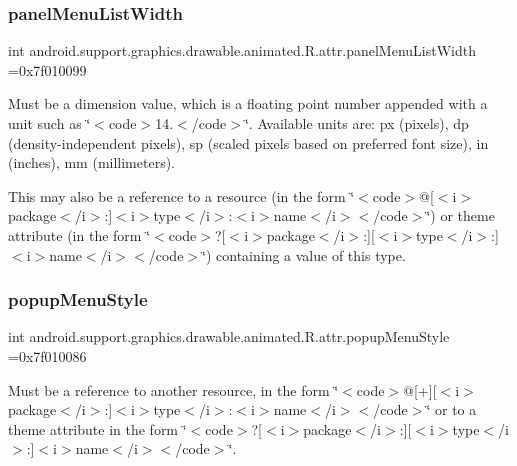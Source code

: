 \subsubsection{\texorpdfstring{panel\+Menu\+List\+Width}{panelMenuListWidth}}
{\footnotesize\ttfamily int android.\+support.\+graphics.\+drawable.\+animated.\+R.\+attr.\+panel\+Menu\+List\+Width =0x7f010099\hspace{0.3cm}{\ttfamily [static]}}

Must be a dimension value, which is a floating point number appended with a unit such as \char`\"{}$<$code$>$14.\+5sp$<$/code$>$\char`\"{}. Available units are\+: px (pixels), dp (density-\/independent pixels), sp (scaled pixels based on preferred font size), in (inches), mm (millimeters). 

This may also be a reference to a resource (in the form \char`\"{}$<$code$>$@\mbox{[}$<$i$>$package$<$/i$>$\+:\mbox{]}$<$i$>$type$<$/i$>$\+:$<$i$>$name$<$/i$>$$<$/code$>$\char`\"{}) or theme attribute (in the form \char`\"{}$<$code$>$?\mbox{[}$<$i$>$package$<$/i$>$\+:\mbox{]}\mbox{[}$<$i$>$type$<$/i$>$\+:\mbox{]}$<$i$>$name$<$/i$>$$<$/code$>$\char`\"{}) containing a value of this type. \mbox{\label{classandroid_1_1support_1_1graphics_1_1drawable_1_1animated_1_1R_1_1attr_a831d1fe21db2e00f27e46cb9e2c01b0f}} 
\subsubsection{\texorpdfstring{popup\+Menu\+Style}{popupMenuStyle}}
{\footnotesize\ttfamily int android.\+support.\+graphics.\+drawable.\+animated.\+R.\+attr.\+popup\+Menu\+Style =0x7f010086\hspace{0.3cm}{\ttfamily [static]}}

Must be a reference to another resource, in the form \char`\"{}$<$code$>$@\mbox{[}+\mbox{]}\mbox{[}$<$i$>$package$<$/i$>$\+:\mbox{]}$<$i$>$type$<$/i$>$\+:$<$i$>$name$<$/i$>$$<$/code$>$\char`\"{} or to a theme attribute in the form \char`\"{}$<$code$>$?\mbox{[}$<$i$>$package$<$/i$>$\+:\mbox{]}\mbox{[}$<$i$>$type$<$/i$>$\+:\mbox{]}$<$i$>$name$<$/i$>$$<$/code$>$\char`\"{}. \mbox{\label{classandroid_1_1support_1_1graphics_1_1drawable_1_1animated_1_1R_1_1attr_adb420ab865f2b2baccbaf58e84118378}} 
